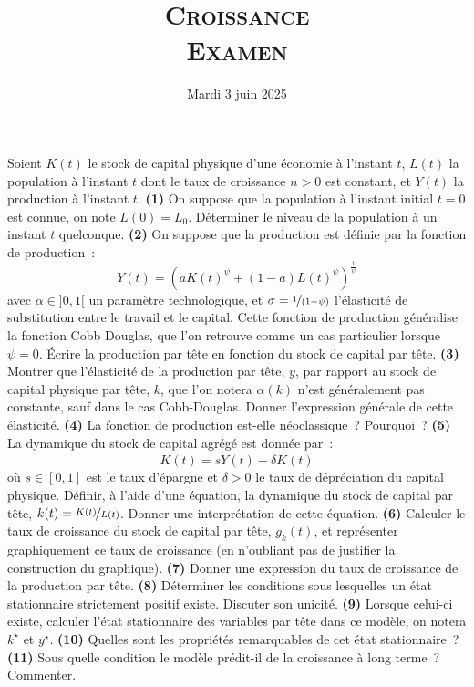 \documentclass[11pt,a4paper,notitlepage,twocolumn]{article}
\begin{document}
\title{\textsc{Croissance\\ \small{Examen}}}
\date{Mardi 3 juin 2025}

\maketitle
\thispagestyle{empty}

Soient $K(t)$ le stock de capital physique d'une économie à l'instant
$t$, $L(t)$ la population à l'instant $t$ dont le taux de croissance
$n>0$ est constant, et $Y(t)$ la production à l'instant
$t$. \textbf{(1)} On suppose que la population à l'instant initial
$t=0$ est connue, on note $L(0) = L_0$. Déterminer le niveau de la
population à un instant $t$ quelconque. \textbf{(2)} On suppose que la
production est définie par la fonction de production~:
\[
Y(t) = \left(aK(t)^{\psi} + (1-a)L(t)^{\psi}\right)^{\frac{1}{\psi}}
\]
avec $\alpha\in]0,1[$ un paramètre technologique,
et $\sigma=\nicefrac{1}{(1-\psi)}$ l'élasticité de substitution entre
le travail et le capital. Cette fonction de production généralise la
fonction Cobb Douglas, que l'on retrouve comme un cas particulier
lorsque $\psi=0$. Écrire la production par tête en fonction du stock
de capital par tête. \textbf{(3)} Montrer que l'élasticité de la
production par tête, $y$, par rapport au stock de capital physique par
tête, $k$, que l'on notera $\alpha(k)$ n'est généralement pas
constante, sauf dans le cas Cobb-Douglas. Donner l'expression générale
de cette élasticité. \textbf{(4)} La fonction de production est-elle
néoclassique~? Pourquoi~? \textbf{(5)} La dynamique du stock de
capital agrégé est donnée par~:
\[
\dot K(t) = sY(t)-\delta K(t)
\]
où $s\in[0,1]$ est le taux d'épargne et $\delta>0$ le taux de
dépréciation du capital physique. Définir, à l'aide d'une équation, la
dynamique du stock de capital par
tête, $k(t)=\nicefrac{K(t)}{L(t)}$. Donner une interprétation de cette
équation. \textbf{(6)} Calculer le taux de croissance du stock de
capital par tête, $g_k(t)$, et représenter graphiquement ce taux de
croissance (en n'oubliant pas de justifier la construction du
graphique). \textbf{(7)} Donner une expression du taux de croissance
de la production par tête. \textbf{(8)} Déterminer les conditions sous
lesquelles un état stationnaire strictement positif existe. Discuter
son unicité. \textbf{(9)} Lorsque celui-ci existe, calculer l'état
stationnaire des variables par tête dans ce modèle, on
notera $k^{\star}$ et $y^{\star}$. \textbf{(10)} Quelles sont les
propriétés remarquables de cet état stationnaire~? \textbf{(11)} Sous
quelle condition le modèle prédit-il de la croissance à long
terme~? Commenter.
\end{document}
